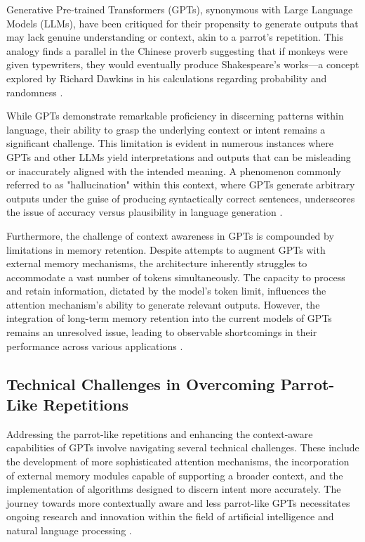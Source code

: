 \documentclass{article}
\begin{document}
Generative Pre-trained Transformers (GPTs), synonymous with Large Language Models (LLMs), have been critiqued for their propensity to generate outputs that may lack genuine understanding or context, akin to a parrot's repetition. This analogy finds a parallel in the Chinese proverb suggesting that if monkeys were given typewriters, they would eventually produce Shakespeare's works—a concept explored by Richard Dawkins in his calculations regarding probability and randomness \citep{dawkins_monkeys}.

While GPTs demonstrate remarkable proficiency in discerning patterns within language, their ability to grasp the underlying context or intent remains a significant challenge. This limitation is evident in numerous instances where GPTs and other LLMs yield interpretations and outputs that can be misleading or inaccurately aligned with the intended meaning. A phenomenon commonly referred to as "hallucination" within this context, where GPTs generate arbitrary outputs under the guise of producing syntactically correct sentences, underscores the issue of accuracy versus plausibility in language generation \citep{gpt_hallucination}.

Furthermore, the challenge of context awareness in GPTs is compounded by limitations in memory retention. Despite attempts to augment GPTs with external memory mechanisms, the architecture inherently struggles to accommodate a vast number of tokens simultaneously. The capacity to process and retain information, dictated by the model's token limit, influences the attention mechanism's ability to generate relevant outputs. However, the integration of long-term memory retention into the current models of GPTs remains an unresolved issue, leading to observable shortcomings in their performance across various applications \citep{gpt_memory_limitations}.

\subsection{Technical Challenges in Overcoming Parrot-Like Repetitions}

Addressing the parrot-like repetitions and enhancing the context-aware capabilities of GPTs involve navigating several technical challenges. These include the development of more sophisticated attention mechanisms, the incorporation of external memory modules capable of supporting a broader context, and the implementation of algorithms designed to discern intent more accurately. The journey towards more contextually aware and less parrot-like GPTs necessitates ongoing research and innovation within the field of artificial intelligence and natural language processing \citep{ai_innovation_challenges}.
\end{document}
